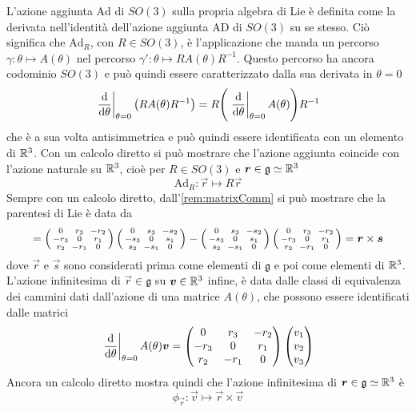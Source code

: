 L'azione aggiunta $\mathrm{Ad}$ di $SO(3)$ sulla propria algebra di Lie è definita come la derivata nell'identità dell'azione aggiunta $\mathrm{AD}$ di $SO(3) $ su se stesso. Ciò significa che $\mathrm{Ad}_R$, con $R \in SO(3)$, è l'applicazione che manda un percorso $\gamma: \theta \mapsto A(\theta)$ nel percorso $\gamma': \theta \mapsto R A(\theta) R^{-1}$. Questo percorso ha ancora codominio $SO(3)$ e può quindi essere caratterizzato dalla sua derivata in $\theta = 0$
\begin{equation*}
\eval{\dv{\theta}}_{\theta=0} \big(R A(\theta)R^{-1}\big) = R \Bigg(\eval{\dv{\theta}}_{\theta=0} A(\theta)\Bigg) R^{-1}
\end{equation*}  
che è a sua volta antisimmetrica e può quindi essere identificata con un elemento di $\mathbb{R}^3$. Con un calcolo diretto si può mostrare che l'azione aggiunta coincide con l'azione naturale su $\mathbb{R}^3$, cioè per $R \in SO(3)$ e $\boldsymbol{r} \in \mathfrak{g} \simeq \mathbb{R}^3$
\begin{equation*}
\mathrm{Ad}_R: \vec{r} \mapsto R \vec{r}
\end{equation*} 
Sempre con un calcolo diretto, dall'\autoref{rem:matrixComm} si può mostrare che la parentesi di Lie è data da
\begin{equation*}
  [\vec{r},\vec{s}] = \left( \smqty{
    0 & r_3 & -r_2 \\
    -r_3 & 0 & r_1 \\
    r_2 & -r_1 & 0
  } \right)  \left( \smqty{
    0 & s_3 & -s_2 \\
    -s_3 & 0 & s_1 \\
    s_2 & -s_1 & 0
  } \right)  - \left( \smqty{
    0 & s_3 & -s_2 \\
    -s_3 & 0 & s_1 \\
    s_2 & -s_1 & 0
  } \right)  \left( \smqty{
    0 & r_3 & -r_2 \\
    -r_3 & 0 & r_1 \\
    r_2 & -r_1 & 0
  } \right)  = \vec{r} \times \vec{s} 
\end{equation*} 
dove $\vec{r}$ e $\vec{s}$ sono considerati prima come elementi di $\mathfrak{g}$ e poi come elementi di $\mathbb{R}^3$. L'azione infinitesima di $\vec{r} \in \mathfrak{g}$ su $\boldsymbol{v} \in \mathbb{R}^3$ infine, è data dalle classi di equivalenza dei cammini dati dall'azione di una matrice $A(\theta)$, che possono essere identificati dalle matrici
\begin{equation*}
\eval{\dv{\theta}}_{\theta=0} A(\theta) \vec{v} = \pmqty{
  0 & r_3 & -r_2 \\
  -r_3 & 0 & r_1 \\
  r_2 & -r_1 & 0
} \mqty(v_1 \\ v_2 \\v_3)
\end{equation*} 
Ancora un calcolo diretto mostra quindi che l'azione infinitesima di $\boldsymbol{r} \in \mathfrak{g} \simeq \mathbb{R}^3$ è 
\begin{equation*}
\phi_{\vec{r}}: \vec{v} \mapsto \vec{r}\times \vec{v}
\end{equation*}

